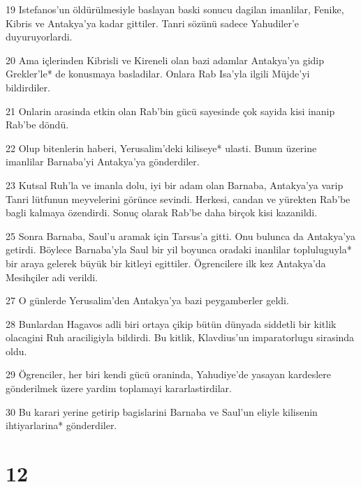 \par 19 Istefanos'un öldürülmesiyle baslayan baski sonucu dagilan imanlilar, Fenike, Kibris ve Antakya'ya kadar gittiler. Tanri sözünü sadece Yahudiler'e duyuruyorlardi.
\par 20 Ama içlerinden Kibrisli ve Kireneli olan bazi adamlar Antakya'ya gidip Grekler'le* de konusmaya basladilar. Onlara Rab Isa'yla ilgili Müjde'yi bildirdiler.
\par 21 Onlarin arasinda etkin olan Rab'bin gücü sayesinde çok sayida kisi inanip Rab'be döndü.
\par 22 Olup bitenlerin haberi, Yerusalim'deki kiliseye* ulasti. Bunun üzerine imanlilar Barnaba'yi Antakya'ya gönderdiler.
\par 23 Kutsal Ruh'la ve imanla dolu, iyi bir adam olan Barnaba, Antakya'ya varip Tanri lütfunun meyvelerini görünce sevindi. Herkesi, candan ve yürekten Rab'be bagli kalmaya özendirdi. Sonuç olarak Rab'be daha birçok kisi kazanildi.
\par 25 Sonra Barnaba, Saul'u aramak için Tarsus'a gitti. Onu bulunca da Antakya'ya getirdi. Böylece Barnaba'yla Saul bir yil boyunca oradaki inanlilar topluluguyla* bir araya gelerek büyük bir kitleyi egittiler. Ögrencilere ilk kez Antakya'da Mesihçiler adi verildi.
\par 27 O günlerde Yerusalim'den Antakya'ya bazi peygamberler geldi.
\par 28 Bunlardan Hagavos adli biri ortaya çikip bütün dünyada siddetli bir kitlik olacagini Ruh araciligiyla bildirdi. Bu kitlik, Klavdius'un imparatorlugu sirasinda oldu.
\par 29 Ögrenciler, her biri kendi gücü oraninda, Yahudiye'de yasayan kardeslere gönderilmek üzere yardim toplamayi kararlastirdilar.
\par 30 Bu karari yerine getirip bagislarini Barnaba ve Saul'un eliyle kilisenin ihtiyarlarina* gönderdiler.

\chapter{12}

